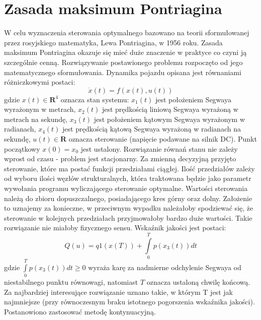 \section{Zasada maksimum Pontriagina}
\label{sec:zasada_max}

W celu wyznaczenia sterowania optymalnego bazowano na teorii sformułowanej przez rosyjskiego matematyka, Lewa Pontriagina, w 1956 roku. Zasada maksimum Pontriagina okazuje się mieć duże znaczenie w praktyce co czyni ją szczególnie cenną. Rozwiązywanie postawionego problemu rozpoczęto od jego matematycznego sformułowania. Dynamika pojazdu opisana jest równaniami różniczkowymi postaci:
\begin{equation}
\dot{x}(t)=f(x(t),u(t))
\end{equation}
gdzie $x(t)\in\textbf{R}^{4}$ oznacza stan systemu: \newline
$x_1(t)$ jest położeniem Segwaya wyrażonym w metrach,\newline
$x_2(t)$ jest prędkością liniową Segwaya wyrażoną w metrach na sekundę,\newline
$x_3(t)$ jest położeniem kątowym Segwaya wyrażonym w radianach,\newline
$x_4(t)$ jest prędkością kątową Segwaya wyrażoną w radianach na sekundę,\newline
\newline
$u(t)\in\textbf{R}$ oznacza sterowanie (napięcie podawane na silnik DC). \newline
Punkt początkowy $x(0)=x_0$ jest ustalony. Rozwiązanie równań stanu nie zależy wprost od czasu - problem jest stacjonarny. Za zmienną decyzyjną przyjęto sterowanie, które ma postać funkcji przedziałami ciągłej. Ilość przedziałów zależy od wyboru ilości węzłów strukturalnych, która traktowana będzie jako parametr wywołania programu wyliczającego sterowanie optymalne. Wartości sterowania należą do zbioru dopuszczalnego, posiadającego kres górny oraz dolny. Założenie to uznajemy za konieczne, w przeciwnym wypadku należałoby spodziewać się, że sterowanie w kolejnych przedziałach przyjmowałoby bardzo duże wartości. Takie rozwiązanie nie miałoby fizycznego sensu. Wskaźnik jakości jest postaci:
\begin{equation}
Q(u)=q1(x(T))+\int\limits_{0}^{T}p(x_3(t))dt
\end{equation}
gdzie $\int\limits_{0}^{T}p(x_3(t))dt\geq0$ wyraża karę za nadmierne odchylenie Segwaya od niestabilnego punktu równowagi, natomiast $T$ oznacza ustaloną chwilę końcową. Za najbardziej interesujące rozwiązanie uznano takie, w którym T jest jak najmniejsze (przy równoczesnym braku istotnego pogorszenia wskaźnika jakości). Postanowiono zastosować metodę kontynuacyjną. \newline
